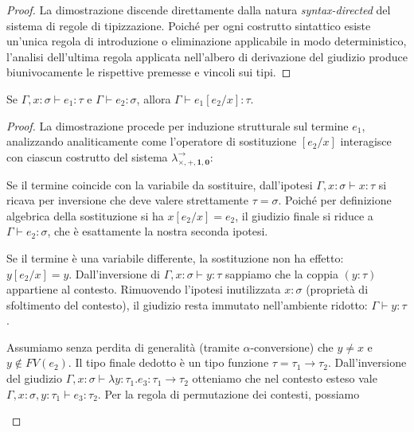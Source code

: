 \begin{proof}
    La dimostrazione discende direttamente dalla natura \emph{syntax-directed} del sistema di regole di tipizzazione. Poiché per ogni costrutto sintattico esiste un'unica regola di 
    introduzione o eliminazione applicabile in modo deterministico, l'analisi dell'ultima regola applicata nell'albero di derivazione del giudizio produce biunivocamente le rispettive 
    premesse e vincoli sui tipi.
\end{proof}

\begin{lem}
    Se $\Gamma, x:\sigma \vdash e_1 : \tau$ e $\Gamma \vdash e_2 : \sigma$, allora $\Gamma \vdash e_1[e_2/x] : \tau$.
\end{lem}
\begin{proof}
    La dimostrazione procede per induzione strutturale sul termine $e_1$, analizzando analiticamente come l'operatore di 
    sostituzione $[e_2/x]$ interagisce con ciascun costrutto del sistema $\lambda^{\to}_{\times, +, \mathbf{1}, \mathbf{0}}$:
    \begin{description}[leftmargin=1.5em, style=nextline]
        \item [Caso Variabile Identica ($e_1 = x$)] 
            Se il termine coincide con la variabile da sostituire, dall'ipotesi $\Gamma, x:\sigma \vdash x : \tau$ si ricava per inversione che deve valere strettamente $\tau = \sigma$. Poiché per definizione 
            algebrica della sostituzione si ha $x[e_2/x] = e_2$, il giudizio finale si riduce a $\Gamma \vdash e_2 : \sigma$, che è esattamente la nostra seconda ipotesi.
        \item [Caso Variabile Distinta ($e_1 = y \neq x$)] 
            Se il termine è una variabile differente, la sostituzione non ha effetto: $y[e_2/x] = y$. Dall'inversione di $\Gamma, x:\sigma \vdash y : \tau$ sappiamo che la coppia $(y:\tau)$ appartiene al contesto. 
            Rimuovendo l'ipotesi inutilizzata $x:\sigma$ (proprietà di sfoltimento del contesto), il giudizio resta immutato nell'ambiente ridotto: $\Gamma \vdash y : \tau$.
        \item [Caso Astrazione ($e_1 = \lambda y:\tau_1. e_3$)] 
            Assumiamo senza perdita di generalità (tramite $\alpha$-conversione) che $y \neq x$ e $y \notin FV(e_2)$. Il tipo finale dedotto è un tipo funzione $\tau = \tau_1 \to \tau_2$. Dall'inversione del giudizio 
            $\Gamma, x:\sigma \vdash \lambda y:\tau_1. e_3 : \tau_1 \to \tau_2$ otteniamo che nel contesto esteso vale $\Gamma, x:\sigma, y:\tau_1 \vdash e_3 : \tau_2$. Per la regola di permutazione dei contesti, possiamo 

\end{description}
\end{proof}
